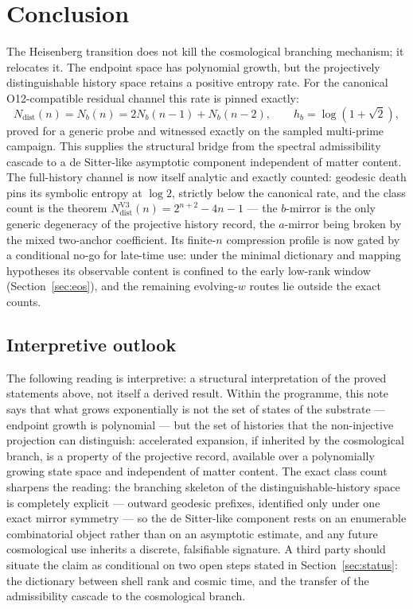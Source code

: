 \documentclass[11pt]{article}
\newcommand{\Ndist}{N_{\mathrm{dist}}}
\newcommand{\Nb}{N_b}
\newcommand{\hb}{h_b}
\newcommand{\NdistV}{N^{\mathrm{V3}}_{\mathrm{dist}}}
\begin{document}
\section{Conclusion}
\label{sec:conclusion}

The Heisenberg transition does not kill the cosmological branching mechanism; it relocates it.
The endpoint space has polynomial growth, but the projectively distinguishable history space retains a
positive entropy rate.
For the canonical O12-compatible residual channel this rate is pinned exactly:
\[
\Ndist(n)=\Nb(n)=2\Nb(n-1)+\Nb(n-2),
\qquad
\hb=\log(1+\sqrt2),
\]
proved for a generic probe and witnessed exactly on the sampled multi-prime campaign.
This supplies the structural bridge from the spectral admissibility cascade to a de Sitter-like asymptotic
component independent of matter content.
The full-history channel is now itself analytic and exactly counted: geodesic death pins its symbolic
entropy at $\log 2$, strictly below the canonical rate, and the class count is the theorem
$\NdistV(n)=2^{n+2}-4n-1$ --- the $b$-mirror is the only generic degeneracy of the projective history
record, the $a$-mirror being broken by the mixed two-anchor coefficient.
Its finite-$n$ compression profile is now gated by a conditional no-go for late-time use: under the minimal
dictionary and mapping hypotheses its observable content is confined to the early low-rank window
(Section~\ref{sec:eos}), and the remaining evolving-$w$ routes lie outside the exact counts.

\subsection*{Interpretive outlook}
The following reading is interpretive: a structural interpretation of the proved statements above, not
itself a derived result.
Within the programme, this note says that what grows exponentially is not the set of states of the
substrate --- endpoint growth is polynomial --- but the set of histories that the non-injective projection
can distinguish: accelerated expansion, if inherited by the cosmological branch, is a property of the
projective record, available over a polynomially growing state space and independent of matter content.
The exact class count sharpens the reading: the branching skeleton of the distinguishable-history space is
completely explicit --- outward geodesic prefixes, identified only under one exact mirror symmetry --- so
the de Sitter-like component rests on an enumerable combinatorial object rather than on an asymptotic
estimate, and any future cosmological use inherits a discrete, falsifiable signature.
A third party should situate the claim as conditional on two open steps stated in
Section~\ref{sec:status}: the dictionary between shell rank and cosmic time, and the transfer of the
admissibility cascade to the cosmological branch.
\end{document}
